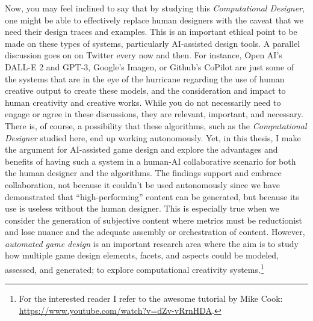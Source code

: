Now, you may feel inclined to say that by studying this \emph{Computational Designer}, one might be able to effectively replace human designers with the caveat that we need their design traces and examples. This is an important ethical point to be made on these types of systems, particularly AI-assisted design tools. A parallel discussion goes on on Twitter every now and then. For instance, Open AI's DALL-E 2 and GPT-3, Google's Imagen, or Github's CoPilot are just some of the systems that are in the eye of the hurricane regarding the use of human creative output to create these models, and the consideration and impact to human creativity and creative works. While you do not necessarily need to engage or agree in these discussions, they are relevant, important, and necessary. There is, of course, a possibility that these algorithms, such as the \emph{Computational Designer} studied here, end up working autonomously. Yet, in this thesis, I make the argument for AI-assisted game design and explore the advantages and benefits of having such a system in a human-AI collaborative scenario for both the human designer and the algorithms. The findings support and embrace collaboration, not because it couldn't be used autonomously since we have demonstrated that ``high-performing'' content can be generated, but because its use is useless without the human designer. This is especially true when we consider the generation of subjective content where metrics must be reductionist and lose nuance and the adequate assembly or orchestration of content. However, \emph{automated game design} is an important research area where the aim is to study how multiple game design elements, facets, and aspects could be modeled, assessed, and generated; to explore computational creativity systems.\footnote{For the interested reader I refer to the awesome tutorial by Mike Cook: \url{https://www.youtube.com/watch?v=dZv-vRrnHDA}.}







